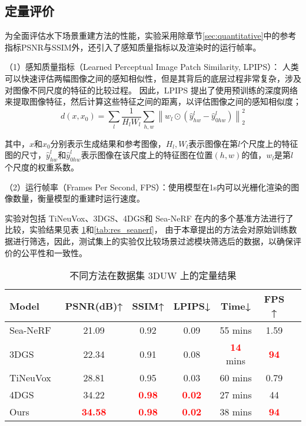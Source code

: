 \subsection{定量评价}
为全面评估水下场景重建方法的性能，实验采用除章节\ref{sec:quantitative}中的参考指标PSNR与SSIM外，还引入了感知质量指标以及渲染时的运行帧率。

（1）感知质量指标（Learned Perceptual Image Patch Similarity, LPIPS）\cite{lpips}： 人类可以快速评估两幅图像之间的感知相似性，但是其背后的底层过程非常复杂，涉及对图像不同尺度的特征的比较过程。
因此，LPIPS 提出了使用预训练的深度网络来提取图像特征，然后计算这些特征之间的距离，以评估图像之间的感知相似度；
\begin{equation}
    d(x, x_0) = \sum_{l} \frac{1}{H_l W_l} \sum_{h,w} \left\| w_l \odot (\hat{y}^l_{hw} - \hat{y}^l_{0hw}) \right\|_2^2
\end{equation}

其中，$x$和$x_0$分别表示生成结果和参考图像，$H_l,W_l$表示图像在第$l$个尺度上的特征图的尺寸，$\hat{y}^l_{hw}$和$\hat{y}^l_{0hw}$表示图像在该尺度上的特征图在位置$(h, w)$的值，$w_l$是第$l$个尺度的权重系数。

（2）运行帧率（Frames Per Second, FPS）：使用模型在1s内可以光栅化渲染的图像数量，衡量模型的重建时运行速度。

实验对包括 TiNeuVox\cite{tineuvox}、3DGS\cite{3DGS}、4DGS\cite{4DGS}和 Sea-NeRF\cite{seathru}
在内的多个基准方法进行了比较，实验结果见表 \ref{tab:res_3duw}和\ref{tab:res_seanerf}，
由于本章提出的方法会对原始训练数据进行筛选，因此，测试集上的实验仅比较场景过滤模块筛选后的数据，以确保评价的公平性和一致性。

\begin{table} [htbp]
    \small
    \centering
    \caption{不同方法在数据集 3DUW 上的定量结果}
    \setlength{\tabcolsep}{10pt}
    \begin{tabular}{lcccccc} 
    \toprule
    Model  & PSNR(dB)↑ & SSIM↑ & LPIPS↓ & Time↓ &  FPS ↑  \\
    \midrule  
    Sea-NeRF\cite{seathru} & 21.09& 0.92 & 0.09 & 55 mins & 1.59\\
    3DGS~\cite{3DGS} &22.34 & 0.91 & 0.08 & \textcolor{red}{\textbf{14}} mins  & \textcolor{red}{\textbf{94}}\\
    TiNeuVox~\cite{tineuvox}  & 28.81 & 0.95 &  0.03 & 60 mins & 0.79\\ 
    4DGS\cite{4DGS} & 34.22&\textcolor{red}{\textbf{0.98}} &\textcolor{red}{\textbf{0.02}}& 27 mins&44 \\
    Ours & \textcolor{red}{\textbf{34.58}} & \textcolor{red}{\textbf{0.98}} & \textcolor{red}{\textbf{0.02}} & 38 mins & \textcolor{red}{\textbf{94}}\\
    \bottomrule
    \end{tabular}  
    \label{tab:res_3duw}
\end{table}
    
